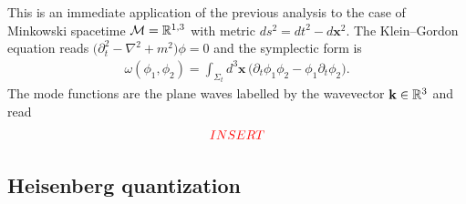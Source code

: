 \documentclass[../QFT_main.tex]{subfiles}
\begin{document}
\begin{mytheorem}
This is an immediate application of the previous analysis to the case of Minkowski spacetime $\mathcal{M}=\mathbb{R}^{1,3}$ with metric $ds^2 = dt^2 - d\mathbf{x}^2$.
The Klein--Gordon equation reads $\big(\partial_t^2 - \nabla^2 + m^2\big)\phi = 0$ and the symplectic form is
\begin{align}
    \omega(\phi_1, \phi_2) = \int_{\Sigma_t} d^3\mathbf{x}\, \big(\partial_t \phi_1 \phi_2 - \phi_1 \partial_t \phi_2\big).
\end{align}
The mode functions are the plane waves labelled by the wavevector $\mathbf{k}\in \mathbb{R}^3$ and read
\begin{align}
    \textcolor{red}{INSERT}
\end{align}
\end{mytheorem}


\subsection{Heisenberg quantization}
\end{document}
